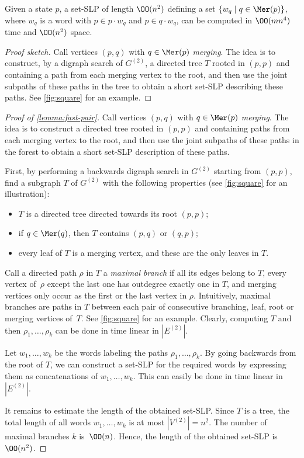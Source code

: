 \begin{lem}
\label{lemma:fast-pair}
    Given a state $p$, a set-SLP of length $\OO(n^2)$ defining a set $\{w_q \mid q \in \Mer(p)\}$, where $w_q$ is a word with $p \in p \cdot w_q$ and $p \in q \cdot w_q$, can be computed in $\OO(mn^4)$ time and $\OO(n^2)$ space.
\end{lem}
\begin{proof}[Proof sketch]
Call vertices $(p, q)$ with $q \in \Mer(p)$ \emph{merging}. The idea is to construct, by a digraph search of $G^{(2)}$, a directed tree $T$ rooted in $(p, p)$  and containing a path from each merging vertex to the root, and then use the joint subpaths of these paths in the tree to obtain a short set-SLP describing these paths. See \autoref{fig:square} for an example.
\end{proof}
\begin{proof}[Proof of \autoref{lemma:fast-pair}]
Call vertices $(p, q)$ with $q \in \Mer(p)$ \emph{merging}. The idea is to construct a directed tree rooted in $(p, p)$ and containing paths from each merging vertex to the root, and then use the joint subpaths of these paths in the forest to obtain a short set-SLP description of these paths.

First, by performing a backwards digraph search in $G^{(2)}$ starting from $(p, p)$, find a subgraph $T$ of $G^{(2)}$ with the following properties (see \autoref{fig:square} for an illustration):
\begin{itemize}
    \item $T$ is a directed tree directed towards its root $(p, p)$;

    \item if $q \in \Mer(q)$, then $T$ contains $(p, q)$ or $(q, p)$;

    \item every leaf of $T$ is a merging vertex, and these are the only leaves in $T$.
\end{itemize}

\noindent
Call a directed path $\rho$ in $T$ a \emph{maximal branch} if all its edges belong to $T$, every vertex of~$\rho$ except the last one has outdegree exactly one in $T$, and merging vertices only occur as the first or the last vertex in $\rho$. Intuitively, maximal branches are paths in $T$ between each pair of consecutive branching, leaf, root or merging vertices of~$T$. See \autoref{fig:square} for an example.
Clearly, computing $T$ and then $\rho_1, \ldots, \rho_k$ can be done in time linear in $|E^{(2)}|$.

Let $w_1, \ldots, w_k$ be the words labeling the paths $\rho_1, \ldots, \rho_k$. 
By going backwards from the root of $T$, we can construct a set-SLP for the required words by expressing them as concatenations of $w_1, \ldots, w_k$. This can easily be done in time linear in $|E^{(2)}|$.

It remains to estimate the length of the obtained set-SLP. Since $T$ is a tree, the total length of all words $w_1, \ldots, w_k$ is at most $|V^{(2)}| = n^2$. The number of maximal branches $k$ is~$\OO(n)$. Hence, the length of the obtained set-SLP is~$\OO(n^2)$.
\end{proof}

